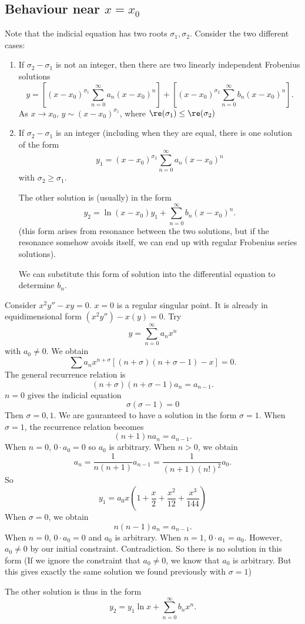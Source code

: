 \documentclass[a4paper]{article}
\begin{document}
\subsection{Behaviour near \texorpdfstring{$x = x_0$}{x = x0}}
Note that the indicial equation has two roots $\sigma_1, \sigma_2$. Consider the two different cases:
\begin{enumerate}
\item If $\sigma_2 - \sigma_1$ is not an integer, then there are two linearly independent Frobenius solutions
\[
y = \left[(x - x_0)^{\sigma_1}\sum_{n = 0}^{\infty} a_n(x - x_0)^n\right] + \left[(x - x_0)^{\sigma_2}\sum_{n = 0}^{\infty} b_n(x - x_0)^n\right].
\]
As $x\to x_0$, $y \sim (x - x_0)^{\sigma_1}$, where $\re(\sigma_1) \leq \re(\sigma_2)$

\item If $\sigma_2 - \sigma_1$ is an integer (including when they are equal, there is one solution of the form
\[
y_1 = (x - x_0)^{\sigma_2}\sum_{n = 0}^{\infty} a_n(x - x_0)^n
\]
with $\sigma_2 \geq \sigma_1$.

The other solution is (usually) in the form
\[
y_2 = \ln(x - x_0)y_1 + \sum_{n = 0}^\infty b_n(x - x_0)^n.
\]
(this form arises from resonance between the two solutions, but if the resonance somehow avoids itself, we can end up with regular Frobenius series solutions).

We can substitute this form of solution into the differential equation to determine $b_n$.

\end{enumerate}
\begin{eg}
  Consider $x^2 y'' - xy = 0$. $x = 0$ is a regular singular point. It is already in equidimensional form $(x^2y'') - x(y) = 0$. Try
\[
y = \sum_{n = 0}^\infty a_n x^n
\]
with $a_0 \not= 0$. We obtain
\[
\sum a_nx^{n + \sigma}[(n + \sigma)(n + \sigma - 1) - x] = 0.
\]
The general recurrence relation is
\[
(n + \sigma)(n + \sigma - 1)a_n = a_{n - 1}.
\]
$n = 0$ gives the indicial equation
\[
\sigma(\sigma - 1) = 0
\]
Then $\sigma = 0, 1$. We are gauranteed to have a solution in the form $\sigma = 1$. When $\sigma = 1$, the recurrence relation becomes
\[
(n + 1)n a_n = a_{n - 1}.
\]
When $n = 0$, $0\cdot a_0 = 0$ so $a_0$ is arbitrary.
When $n > 0$, we obtain
\[
a_n = \frac{1}{n(n +1)}a_{n - 1} = \frac{1}{(n + 1)(n!)^2}a_0.
\]
So
\[
y_1 = a_0x\left(1 + \frac{x}{2} + \frac{x^2}{12} + \frac{x^3}{144}\right)
\]
When $\sigma = 0$, we obtain 
\[
n(n - 1)a_n = a_{n - 1}.
\]
When $n = 0$, $0\cdot a_0 = 0$ and $a_0$ is arbitrary. When $n = 1$, $0\cdot a_1 = a_0$. However, $a_0\not= 0$ by our initial constraint. Contradiction. So there is no solution in this form (If we ignore the constraint that $a_0\not= 0$, we know that $a_0$ is arbitrary. But this gives exactly the same solution we found previously with $\sigma = 1$)

The other solution is thus in the form 
\[
y_2 = y_1\ln x + \sum_{n = 0}^\infty b_nx^n.
\]
\end{eg}
\end{document}
